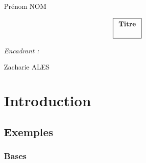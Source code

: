 \documentclass[12pt]{report}
\begin{document}
\pagestyle{fancyplain}
\renewcommand{\chaptermark}[1]{\markboth{\chaptername\ \thechapter. #1}{}}
\renewcommand{\sectionmark}[1]{\markright{\thesection. #1}}
\lhead[]{\fancyplain{}{\bfseries\leftmark}}
\rhead[]{\fancyplain{}{\bfseries\thepage}}
\cfoot{}

\makeatletter
\def\figurename{{\protect\sc \protect\small\bfseries Fig.}}
\def\f@ffrench{\protect\figurename\space{\protect\small\bf \thefigure}\space}
\let\fnum@figure\f@ffrench%
\let\captionORI\caption
\def\caption#1{\captionORI{\rm\small #1}}
\makeatother
\edef\hc{\string:}
\graphicspath{{img/}}

\thispagestyle{empty}
{\Large
\begin{center}
Prénom NOM
\vskip1cm


$$\fbox{$
  \begin{array}{c}
  \textbf{Titre}
  \vphantom{\int_\int}
  \end{array}
  $}
$$
\end{center}
\vskip8cm

\begin{flushright}
\textit{Encadrant :}

Zacharie ALES
\end{flushright}
}

\clearpage

\renewcommand{\baselinestretch}{1.30}\small \normalsize

\tableofcontents

\renewcommand{\baselinestretch}{1.18}\small \normalsize


\chapter{Introduction}

\section{Exemples}

\subsection{Bases}
\end{document}
